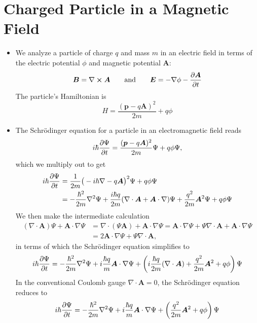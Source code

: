\documentclass[11pt, a4paper]{article}
\renewcommand{\div}{\nabla \cdot}
\renewcommand{\curl}{\nabla \cross}
\renewcommand{\grad}{\nabla}
\renewcommand{\laplacian}{\nabla^{2}}
\newcommand{\eqtext}[1]{\qquad \text{#1} \qquad}
\newcommand{\Schro}{Schr\"{o}dinger\xspace}
\renewcommand{\vec}[1]{\bm{#1}}  %
\newcommand{\A}{\vec{A}}  %
\renewcommand{\P}{\Psi}  %
\begin{document}
\section{Charged Particle in a Magnetic Field}
\begin{itemize}
	\item We analyze a particle of charge $ q $ and mass $ m $ in an electric field in terms of the electric potential $ \phi $ and magnetic potential $ \A $:
	\begin{equation*}
		\vec{B} = \curl \A \eqtext{and} \vec{E} = - \grad \phi - \pdv{\A}{t}
	\end{equation*}
	The particle's Hamiltonian is
	\begin{equation*}
		H = \frac{(\vec{p} - q\A)^{2}}{2m} + q \phi
	\end{equation*}
	
	\item The \Schro equation for a particle in an electromagnetic field reads
	\begin{equation*}
		i \hbar \pdv{\P}{t} = \frac{(\vec{p} - q\A)^{2}}{2m}\P + q \phi\P,
    \end{equation*}
    which we multiply out to get
    \begin{align*}
        i \hbar \pdv{\P}{t} &= \frac{1}{2m}\big(-i\hbar \grad - q\A\big)^{2}\P + q\phi \P\\
    & = -\frac{\hbar^{2}}{2m}\laplacian \P + \frac{i \hbar q}{2m}(\div \A + \A \cdot \grad)\P + \frac{q^{2}}{2m}\A^{2}\P + q \phi \P
    \end{align*}
	We then make the intermediate calculation
	\begin{align*}
		(\div \A) \P + \A \cdot \grad \P & = \div (\P \A) + \A \cdot \grad \P = \A \cdot \grad \P + \P \div \A + \A \cdot \grad \P \\
		& = 2\A \cdot \grad \P + \P \div \A,
	\end{align*}
    in terms of which the \Schro equation simplifies to
	\begin{equation*}
		i \hbar \pdv{\P}{t} = -\frac{\hbar^{2}}{2m}\laplacian \P + i \frac{\hbar q}{m}\A \cdot \grad \P + \left(i\frac{\hbar q}{2m}(\div \A) + \frac{q^{2}}{2m}\A^{2} + q\phi\right)\P
	\end{equation*}
	In the conventional Coulomb gauge $ \div \A = 0 $, the \Schro equation reduces to
	\begin{equation*}
		i \hbar \pdv{\P}{t} = -\frac{\hbar^{2}}{2m}\laplacian \P + i \frac{\hbar q}{m}\A \cdot \grad \P + \left(\frac{q^{2}}{2m}\A^{2} + q\phi\right)\P
	\end{equation*}
\end{itemize}
\end{document}
